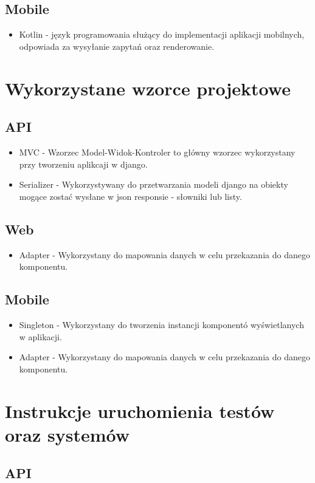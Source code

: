 \documentclass{article}
\begin{document}
\subsection{Mobile}
\begin{itemize}
    \item Kotlin - język programowania służący do implementacji aplikacji mobilnych, odpowiada za wysyłanie zapytań oraz renderowanie.
\end{itemize}

\section{Wykorzystane wzorce projektowe}
\subsection{API}
\begin{itemize}
    \item MVC - Wzorzec Model-Widok-Kontroler to główny wzorzec wykorzystany przy tworzeniu aplikcaji w django.
    \item Serializer - Wykorzystywany do przetwarzania modeli django na obiekty mogące zostać wysłane w json responsie - słowniki lub listy.
\end{itemize}
\subsection{Web}
\begin{itemize}
    \item Adapter - Wykorzystany do mapowania danych w celu przekazania do danego komponentu.
\end{itemize}
\subsection{Mobile}
\begin{itemize}
    \item Singleton - Wykorzystany do tworzenia instancji komponentó wyświetlanych w aplikacji.
    \item Adapter - Wykorzystany do mapowania danych w celu przekazania do danego komponentu.
\end{itemize}

\section{Instrukcje uruchomienia testów oraz systemów}
\subsection{API}
\end{document}
